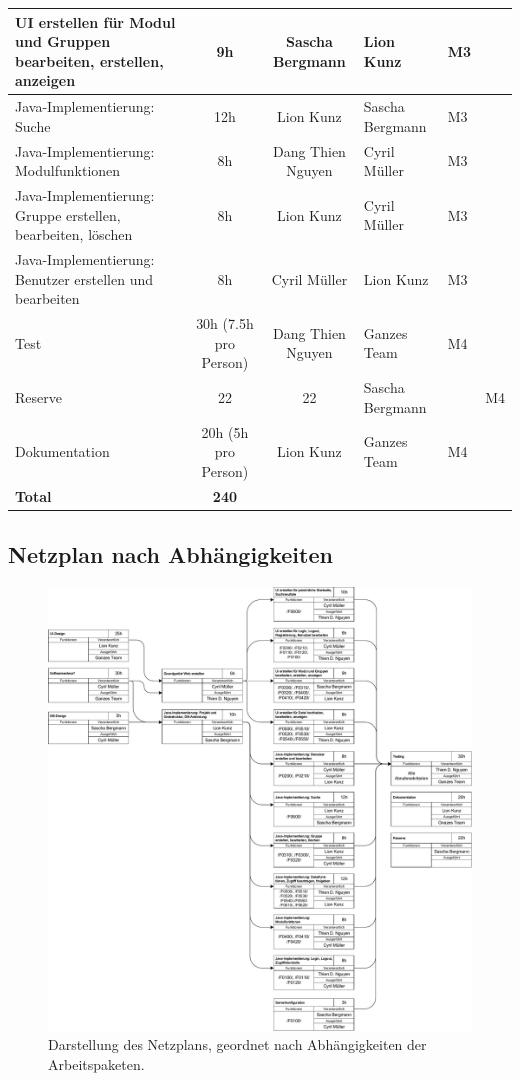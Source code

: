 \begin{landscape}
\begin{tabularx}{\linewidth}{|X|c|c|l|l|c|}
UI erstellen für Modul und Gruppen bearbeiten, erstellen, anzeigen		&	9h	&	Sascha Bergmann	&	Lion Kunz&	M3\\ \hline
Java-Implementierung: Suche 											&	12h	&	Lion Kunz		&	Sascha Bergmann&	M3\\ \hline
Java-Implementierung: Modulfunktionen 									&	8h	&	Dang Thien Nguyen&	Cyril Müller&	M3\\ \hline
Java-Implementierung: Gruppe erstellen, bearbeiten, löschen 			&	8h	&	Lion Kunz		&	Cyril Müller&	M3\\ \hline
Java-Implementierung: Benutzer erstellen und bearbeiten 				&	8h	&	Cyril Müller	&	Lion Kunz&	M3\\ \hline
Test 																	&	30h (7.5h pro Person)	&	Dang Thien Nguyen&	Ganzes Team&	M4\\ \hline
Reserve 																&	22	&	22	&	Sascha Bergmann	&	&	M4\\ \hline
Dokumentation 															&	20h (5h pro Person)&	Lion Kunz		&	Ganzes Team&	M4\\ \hline
\textbf{Total}																	&	\textbf{240}	&		&	&	&	\\ \hline
\end{tabularx}
\end{landscape}


\subsection{Netzplan nach Abhängigkeiten}
\begin{figure}[H]
\includegraphics[width=1.1\linewidth]{graphics/netzplan_s1.pdf}
\caption{Darstellung des Netzplans, geordnet nach Abhängigkeiten der Arbeitspaketen.}
\end{figure}